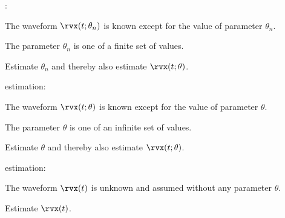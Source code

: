 \begin{enume}
   \item {}:
      \begin{liste}
         \item The waveform $\rvx(t;\theta_n)$ is known except for the value of parameter $\theta_n$.
         \item The parameter $\theta_n$ is one of a finite set of values.
         \item Estimate $\theta_n$ and thereby also estimate $\rvx(t;\theta)$.
      \end{liste}
   \item {} estimation:
      \begin{liste}
         \item The waveform $\rvx(t;\theta)$ is known except for the value of parameter $\theta$.
         \item The parameter $\theta$ is one of an infinite set of values.
         \item Estimate $\theta$ and thereby also estimate $\rvx(t;\theta)$.
      \end{liste}
   \item {} estimation:
      \begin{liste}
         \item The waveform $\rvx(t)$ is unknown and assumed without any parameter $\theta$.
         \item Estimate $\rvx(t)$.
      \end{liste}
\end{enume}


